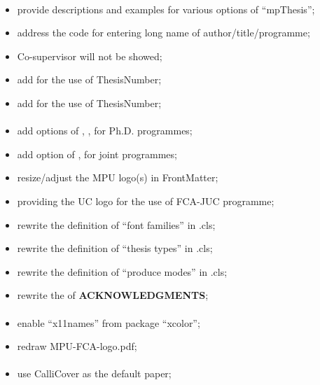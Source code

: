 \paragraph{}
	\begin{itemize}[noitemsep]
		\item provide descriptions and examples for various options of ``mpThesis'';
		\item address the code for entering long name of author/title/programme;
		\item Co-supervisor will not be showed;
		\item add  for the use of ThesisNumber;
		\item add  for the use of ThesisNumber;
	\end{itemize}

\paragraph{}
	\begin{itemize}[noitemsep]
		\item add options of , ,  for Ph.D. programmes;
		\item add option of ,  for joint programmes;
		\item resize/adjust the MPU logo(s) in FrontMatter;
		\item providing the UC logo for the use of FCA-JUC programme;
		\item rewrite the definition of ``font families'' in .cls;
		\item rewrite the definition of ``thesis types'' in .cls;
		\item rewrite the definition of ``produce modes'' in .cls;
		\item rewrite the of \textbf{ACKNOWLEDGMENTS};
	\end{itemize}

\paragraph{}
	\begin{itemize}[noitemsep]
		\item enable ``x11names'' from package ``xcolor'';
		\item redraw MPU-FCA-logo.pdf;
	\end{itemize}

\paragraph{}
	\begin{itemize}[noitemsep]
		\item use CalliCover as the default  paper;
	\end{itemize}


